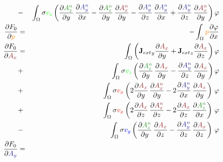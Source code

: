 \documentclass[smallextended]{svjour3}       %
\begin{document}
\begin{eqnarray}
			\nonumber \\
			& - &\int_{\Omega} \sigma \textcolor{green}{v_z} \left(\frac{\partial \textcolor{darkGreen}{A_z^n}}{\partial y}\,\frac{\partial \textcolor{darkBlue}{A_y^n}}{\partial x} - \frac{\partial \textcolor{darkGreen}{A_z^n}}{\partial y}\,\frac{\partial \textcolor{darkRed}{A_x^n}}{\partial y} - \frac{\partial \textcolor{darkBlue}{A_y^n}}{\partial z}\,\frac{\partial \textcolor{darkBlue}{A_y^n}}{\partial x} + \frac{\partial \textcolor{darkBlue}{A_y^n}}{\partial z}\,\frac{\partial \textcolor{darkRed}{A_x^n}}{\partial y} \right) \varphi \\			
			\frac{\partial F_0}{\partial \textcolor{orange}{p}} & = &
		- \int_{\Omega} \textcolor{orange}{p} \frac{\partial \varphi}{\partial x} \\			
			\frac{\partial F_0}{\partial \textcolor{darkRed}{A_x}} & = &
			\int_{\Omega} \left({\mathbf{J}_{ext}}_y \frac{\partial \textcolor{darkRed}{A_x}}{\partial y} + {\mathbf{J}_{ext}}_z \frac{\partial \textcolor{darkRed}{A_x}}{\partial z}\right) \varphi			
			\nonumber \\
			& + &\int_{\Omega} \sigma \textcolor{green}{v_z} \left(\frac{\partial \textcolor{darkGreen}{A_z^n}}{\partial y}\,\frac{\partial \textcolor{darkRed}{A_x}}{\partial y} - \frac{\partial \textcolor{darkBlue}{A_y^n}}{\partial z}\,\frac{\partial \textcolor{darkRed}{A_x}}{\partial y} \right) \varphi \nonumber \\			
			& + & \int_{\Omega} \sigma \textcolor{red}{v_x} \left( 2 \frac{\partial \textcolor{darkRed}{A_x}}{\partial y}\,\frac{\partial \textcolor{darkRed}{A_x^n}}{\partial y} - 2 \frac{\partial \textcolor{darkBlue}{A_y^n}}{\partial x}\,\frac{\partial \textcolor{darkRed}{A_x}}{\partial y} \right)\, \varphi \nonumber \\			
			& + & \int_{\Omega} \sigma \textcolor{red}{v_x} \left(2 \frac{\partial \textcolor{darkRed}{A_x}}{\partial z}\,\frac{\partial \textcolor{darkRed}{A_x^n}}{\partial z} - 2 \frac{\partial \textcolor{darkRed}{A_x}}{\partial z}\,\frac{\partial \textcolor{darkGreen}{A_z^n}}{\partial x} \right)\, \varphi \nonumber \\			
			& - & \int_{\Omega} \sigma \textcolor{blue}{v_y} \left(\frac{\partial \textcolor{darkGreen}{A_z^n}}{\partial y}\,\frac{\partial \textcolor{darkRed}{A_x}}{\partial z} - \frac{\partial \textcolor{darkBlue}{A_y^n}}{\partial z}\,\frac{\partial \textcolor{darkRed}{A_x}}{\partial z} \right)\, \varphi \\			
			\frac{\partial F_0}{\partial \textcolor{darkBlue}{A_y}} & = &

\end{eqnarray}
\end{document}
